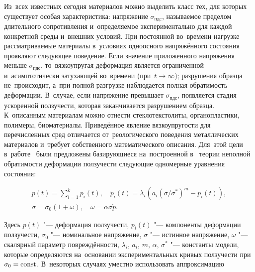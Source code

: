  Из~всех известных сегодня материалов можно выделить класс тех, для которых существует особая характеристика: напряжение $\sigma_{\text{пдс}}$, называемое пределом длительного сопротивления и~определяемое экспериментально для каждой конкретной среды и~внешних условий. При постоянной во~времени нагрузке рассматриваемые материалы в~условиях одноосного напряжённого состояния проявляют следующее поведение. Если значение приложенного напряжения меньше $\sigma_{\text{пдс}}$, то~вязкоупругая деформация является ограниченной и~асимптотически затухающей во~времени (при~\mbox{$t\to\infty$}); разрушения образца не~происходит, а~при полной разгрузке наблюдается полная обратимость деформации. В~случае, если напряжение превышает $\sigma_{\text{пдс}}$, появляется стадия ускоренной ползучести, которая заканчивается разрушением образца. К~описанным материалам можно отнести стеклотекстолиты, органопластики, полимеры, биоматериалы. Приведённое явление вязкоупругости для перечисленных сред отличается от~реологического поведения металлических материалов и~требует собственного математического описания. Для~этой цели в~работе~\cite{gorbunov:bib1} были предложены базирующиеся на~построенной в~\cite{gorbunov:bib2} теории неполной обратимости деформации ползучести следующие одномерные уравнения состояния:

\begin{equation}\label{Gorbunov_model}

\begin{array}{c}

p(t)=\sum\limits_{i=1}^{k}p_i(t),\quad 

\dot{p}_{i}(t)=\lambda_i \left(a_i (\sigma/\sigma^*)^m-p_i(t)\right),\\

\sigma=\sigma_0(1+\omega),\quad 

\dot{\omega}=\alpha\sigma\dot{p}.

\end{array}

\end{equation}

%

Здесь $p(t)$ "---  деформация ползучести, $p_i(t)$ "---  компоненты деформации ползучести, $\sigma_0$ "---  номинальное напряжение, $\sigma$ "---  истинное напряжение, $\omega$ "---  скалярный параметр повреждённости,  $\lambda_i$, $a_i$, $m$, $\alpha$, $\sigma^*$ "---  константы модели, которые определяются на~основании экспериментальных кривых ползучести при~\mbox{$\sigma_0=\rm const$}. В~некоторых случаях уместно использовать аппроксимацию

